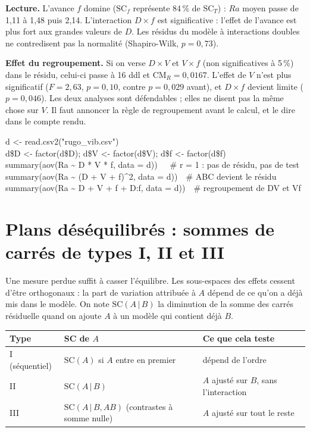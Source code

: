 \documentclass[11pt,a4paper]{article}
\theoremstyle{sj}
\theoremstyle{definition}
\theoremstyle{remark}
\newcommand{\SC}{\mathrm{SC}}
\newcommand{\CM}{\mathrm{CM}}
\providecommand{\og}{\guillemotleft\nobreakspace}
\providecommand{\fg}{\nobreakspace\guillemotright}
\begin{document}
\textbf{Lecture.} L'avance $f$ domine ($\SC_f$ représente 84\,\% de $\SC_T$) : $Ra$ moyen passe de 1,11 à 1,48 puis 2,14. L'interaction $D\times f$ est significative : l'effet de l'avance est plus fort aux grandes valeurs de $D$. Les résidus du modèle à interactions doubles ne contredisent pas la normalité (Shapiro-Wilk, $p=0{,}73$).

\textbf{Effet du regroupement.} Si on verse $D\times V$ et $V\times f$ (non significatives à 5\,\%) dans le résidu, celui-ci passe à 16 ddl et $\CM_R=0{,}0167$. L'effet de $V$ n'est plus significatif ($F=2{,}63$, $p=0{,}10$, contre $p=0{,}029$ avant), et $D\times f$ devient limite ($p=0{,}046$). Les deux analyses sont défendables ; elles ne disent pas la même chose sur $V$. Il faut annoncer la règle de regroupement avant le calcul, et le dire dans le compte rendu.

\begin{code}
d <- read.csv2("rugo\_vib.csv")\\
d\$D <- factor(d\$D); d\$V <- factor(d\$V); d\$f <- factor(d\$f)\\
summary(aov(Ra \textasciitilde{} D * V * f, data = d))\ \ \ \# r = 1 : pas de résidu, pas de test\\
summary(aov(Ra \textasciitilde{} (D + V + f)\textasciicircum2, data = d))\ \ \# ABC devient le résidu\\
summary(aov(Ra \textasciitilde{} D + V + f + D:f, data = d))\ \ \# regroupement de DV et Vf
\end{code}

\section[Plans déséquilibrés]{Plans déséquilibrés : sommes de carrés de types I, II et III}\label{sec:deseq}

Une mesure perdue suffit à casser l'équilibre. Les sous-espaces des effets cessent d'être orthogonaux : la part de variation \og attribuée\fg{} à $A$ dépend de ce qu'on a déjà mis dans le modèle. On note $\SC(A\,|\,B)$ la diminution de la somme des carrés résiduelle quand on ajoute $A$ à un modèle qui contient déjà $B$.

\begin{center}
\begin{tabular}{l l p{4.6cm}}
\toprule
Type & SC de $A$ & Ce que cela teste\\
\midrule
I (séquentiel) & $\SC(A)$ si $A$ entre en premier & dépend de l'ordre\\
II & $\SC(A\,|\,B)$ & $A$ ajusté sur $B$, sans l'interaction\\
III & $\SC(A\,|\,B,AB)$ (contrastes à somme nulle) & $A$ ajusté sur tout le reste\\
\bottomrule
\end{tabular}
\end{center}
\end{document}
